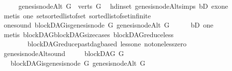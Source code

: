 \begin{isabellebody}
\ \ \isamarkupfalse%
\ \isamarkupfalse%
\ {\isachardoublequoteopen}genesis{\isacharunderscore}{\kern0pt}nodeAlt\ G\ {\isasymin}\ verts\ G{\isachardoublequoteclose}\ \isamarkupfalse%
\ hd{\isacharunderscore}{\kern0pt}in{\isacharunderscore}{\kern0pt}set\ genesis{\isacharunderscore}{\kern0pt}nodeAlt{\isachardot}{\kern0pt}simps\ bD\ exone\isanewline
\ \ \ \ \isamarkupfalse%
\ {\isacharparenleft}{\kern0pt}metis\ one\ set{\isacharunderscore}{\kern0pt}sorted{\isacharunderscore}{\kern0pt}list{\isacharunderscore}{\kern0pt}of{\isacharunderscore}{\kern0pt}set\ sorted{\isacharunderscore}{\kern0pt}list{\isacharunderscore}{\kern0pt}of{\isacharunderscore}{\kern0pt}set{\isachardot}{\kern0pt}infinite{\isacharparenright}{\kern0pt}\ \isanewline
\ \ \isamarkupfalse%
\ \isamarkupfalse%
\ one{\isacharunderscore}{\kern0pt}sound{\isacharcolon}{\kern0pt}\ {\isachardoublequoteopen}blockDAG{\isachardot}{\kern0pt}is{\isacharunderscore}{\kern0pt}genesis{\isacharunderscore}{\kern0pt}node\ G\ {\isacharparenleft}{\kern0pt}genesis{\isacharunderscore}{\kern0pt}nodeAlt\ G{\isacharparenright}{\kern0pt}{\isachardoublequoteclose}\isanewline
\ \ \ \ \isamarkupfalse%
\ bD\ one\ \isanewline
\ \ \ \ \isamarkupfalse%
\ {\isacharparenleft}{\kern0pt}metis\ blockDAG{\isachardot}{\kern0pt}blockDAG{\isacharunderscore}{\kern0pt}size{\isacharunderscore}{\kern0pt}cases\ blockDAG{\isachardot}{\kern0pt}reduce{\isacharunderscore}{\kern0pt}less\isanewline
\ \ \ \ \ \ \ \ blockDAG{\isachardot}{\kern0pt}reduce{\isacharunderscore}{\kern0pt}past{\isacharunderscore}{\kern0pt}dagbased\ less{\isacharunderscore}{\kern0pt}one\ not{\isacharunderscore}{\kern0pt}one{\isacharunderscore}{\kern0pt}less{\isacharunderscore}{\kern0pt}zero{\isacharparenright}{\kern0pt}\isanewline
{}\isamarkupfalse%
%
\endisatagproof
{\isafoldproof}%
%
\isadelimproof
\isanewline
%
\endisadelimproof
\isanewline
{}\isamarkupfalse%
\ genesis{\isacharunderscore}{\kern0pt}nodeAlt{\isacharunderscore}{\kern0pt}sound\ {\isacharcolon}{\kern0pt}\ \isanewline
\ \ \ {\isachardoublequoteopen}blockDAG\ G{\isachardoublequoteclose}\isanewline
\ \ \ {\isachardoublequoteopen}blockDAG{\isachardot}{\kern0pt}is{\isacharunderscore}{\kern0pt}genesis{\isacharunderscore}{\kern0pt}node\ G\ {\isacharparenleft}{\kern0pt}genesis{\isacharunderscore}{\kern0pt}nodeAlt\ G{\isacharparenright}{\kern0pt}{\isachardoublequoteclose}\ \isanewline
%
\isadelimproof
%
\endisadelimproof
%

\end{isabellebody}
